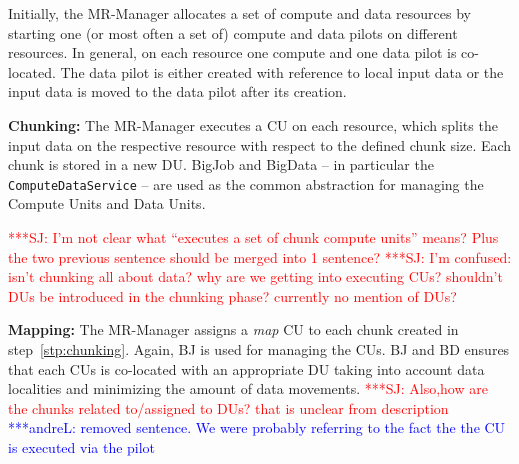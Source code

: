 \documentclass{acm_proc_article-sp}
\newcommand{\jhanote}[1]{ {\textcolor{red} { ***SJ: #1 }}}
\newcommand{\alnote}[1]{ {\textcolor{blue} { ***andreL: #1 }}}
\newcommand{\pnote}[1]{ {\textcolor{magenta} { ***pradeep: #1 }}}
\newcommand{\alnote}[1]{}
\newcommand{\pnote}[1]{}
\newcommand{\jhanote}[1]{}
\newcommand{\upp}{\vspace*{-0.5em}}
\newcommand{\mrmg}{MR-Manager\xspace}
\newcommand{\computeunits}{Compute Units\xspace}
\newcommand{\cu}{CU\xspace}
\newcommand{\dataunits}{Data Units\xspace}
\begin{document}
\upp
\begin{compactenum}[A.]

\item Initially, the \mrmg allocates a set of compute and data
  resources by starting one (or most often a set of) compute and data
  pilots on different resources.  In general, on each resource one
  compute and one data pilot is co-located. The data pilot is either
  created with reference to local input data or the input data is
  moved to the data pilot after its creation.


\item \textbf{Chunking:} %
  The \mrmg executes a \cu on each resource, which splits the input
  data on the respective resource with respect to the defined chunk
  size.\label{stp:chunking} %
Each chunk is stored in a new DU. BigJob and BigData -- in particular
the \texttt{ComputeDataService} -- are used as the common abstraction
for managing the \computeunits and \dataunits. 
  
  \jhanote{I'm not clear what ``executes a set of chunk compute
    units'' means? Plus the two previous sentence should be merged
    into 1 sentence?} \jhanote{I'm confused: isn't chunking all about
    data? why are we getting into executing CUs? shouldn't DUs be
    introduced in the chunking phase? currently no mention of DUs?}

\item \textbf{Mapping:} The \mrmg assigns a {\it map} CU to each
  chunk created in step~\ref{stp:chunking}. Again, BJ is used for
  managing the CUs. BJ and BD ensures that each CUs is co-located with
  an appropriate DU taking into account data localities and minimizing
  the amount of data movements. %
\jhanote{Also,how are the chunks related to/assigned to DUs? that is
  unclear from description}\alnote{removed sentence. We were probably
  referring to the fact the the CU is executed via the pilot}
	

\end{compactenum}
\end{document}
